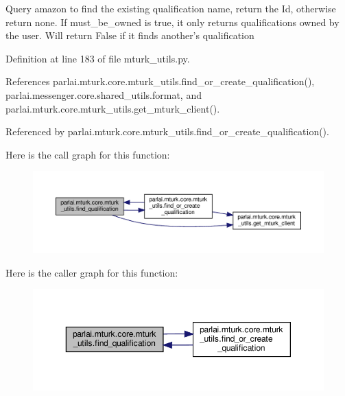 \begin{DoxyVerb}Query amazon to find the existing qualification name, return the Id,
otherwise return none.
If must_be_owned is true, it only returns qualifications owned by the user.
Will return False if it finds another's qualification
\end{DoxyVerb}
 

Definition at line 183 of file mturk\+\_\+utils.\+py.



References parlai.\+mturk.\+core.\+mturk\+\_\+utils.\+find\+\_\+or\+\_\+create\+\_\+qualification(), parlai.\+messenger.\+core.\+shared\+\_\+utils.\+format, and parlai.\+mturk.\+core.\+mturk\+\_\+utils.\+get\+\_\+mturk\+\_\+client().



Referenced by parlai.\+mturk.\+core.\+mturk\+\_\+utils.\+find\+\_\+or\+\_\+create\+\_\+qualification().

Here is the call graph for this function\+:
\nopagebreak
\begin{figure}[H]
\begin{center}
\leavevmode
\includegraphics[width=350pt]{namespaceparlai_1_1mturk_1_1core_1_1mturk__utils_a54121023abc81124ba03cc50d5f23af3_cgraph}
\end{center}
\end{figure}
Here is the caller graph for this function\+:
\nopagebreak
\begin{figure}[H]
\begin{center}
\leavevmode
\includegraphics[width=350pt]{namespaceparlai_1_1mturk_1_1core_1_1mturk__utils_a54121023abc81124ba03cc50d5f23af3_icgraph}
\end{center}
\end{figure}
\mbox{\label{namespaceparlai_1_1mturk_1_1core_1_1mturk__utils_a577e2527c04682284394b0951a090695}} 
